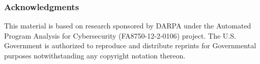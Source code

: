 \documentclass{llncs}
\begin{document}
\subsubsection*{Acknowledgments}
This material is based on research sponsored by DARPA under the
Automated Program Analysis for Cybersecurity (FA8750-12-2-0106)
project. The U.S. Government is authorized to reproduce and distribute
reprints for Governmental purposes notwithstanding any copyright
notation thereon.





\begin{comment}
\begin{equation}
\begin{aligned}
	preimage~f~[a,b]
	&\ =\ \lzfclet{
		A & [a,b] \i [0.5,1]
	}{\lzfccase{A}{
		\emptyset & \emptyset \\
		{[a,b]} & [if~0.5 \leq a~then~0~else~a,b]
		}
	}
\\
	&\ =\ \lzfclet{
		A & [a,b] \i [0.5,1]
	}{if~0.5 \in A~then~A \u [0,0.5]~else~A
	}
\end{aligned}
\end{equation}

\begin{equation}
	preimage~f~B
	\ =\ \lzfclet{
		A & B \i [0.5,1]
	}{if~0.5 \in A~then~A \u [0,0.5]~else~A
	}
\end{equation}

Let $max : \Re^2 \to \Re$; then
\begin{equation}
\begin{aligned}
	&\pair{x,y} \in preimage~max~[a,b]
\\
	&\tab \iff (x \in [a,b]~and~y \leq b)~or~(y \in [a,b]~and~x \leq b)
\\
	&\tab \iff (\pair{x,y} \in [a,b] \times (-\infty,b])~or~(\pair{x,y} \in (-\infty,b] \times [a,b])
\\
	&\tab \iff \pair{x,y} \in [a,b] \times (-\infty,b]~\u~(-\infty,b] \times [a,b]
\end{aligned}
\end{equation}
therefore
\begin{equation}
	preimage~max~[a,b]\ =\ [a,b] \times (-\infty,b]~\u~(-\infty,b] \times [a,b]
\end{equation}


\end{comment}
\end{document}
